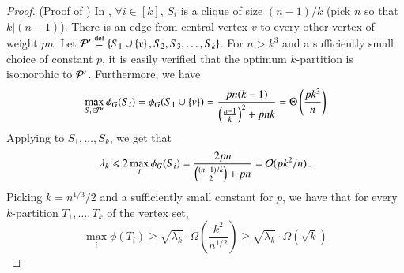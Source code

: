 \documentclass[11pt]{article}
\newcommand{\Pnote}{\Authornote{Prasad}}
\begin{document}
%
\begin{proof} (Proof of )
In , $\forall i \in [k]$, $S_i$ is a clique of size $(n-1)/k$ (pick $n$ so that $k|(n-1)$).
There is an edge from central vertex $v$ to every other vertex of weight $pn$. 
Let $\mathcal P' \stackrel{\textup{def}}{=} \left\{S_1 \cup \left\{v\right\}, S_2, S_3, \ldots, S_k\right\} $.
For $n > k^3$ and a sufficiently small choice of constant $p$, it is easily verified that the optimum $k$-partition is isomorphic
to $\mathcal P'$.
Furthermore, we have
\[ \max_{S_i \in \mathcal P'} \phi_G(S_i) = \phi_G(S_1 \cup \left\{v\right\}) =
	\frac{pn(k-1)}{ \left( \frac{n-1}{k} \right)^2 + pnk}  = \Theta \left(\frac{pk^3}{n} \right) \]
Applying  to $S_1, \ldots, S_k$,
we get that 
$$\lambda_k \leqslant  2\max_i \phi_G(S_i) = \frac{2pn}{
	\binom{(n-1)/k}{2}+ pn} =  \mathcal{O}(p k^2/n) \,. $$
Picking $k = n^{1/3}/2$ and a sufficiently small constant for $p$, we have
that for every $k$-partition $T_1, \ldots, T_k$ of the vertex set, 
$$\max_i \phi(T_i) \geq \sqrt{\lambda_k} \cdot
\Omega\left(\frac{k^2}{n^{1/2}}\right) \geq \sqrt{\lambda_k} \cdot
\Omega(\sqrt{k}) $$
\end{proof}


%






\end{document}
